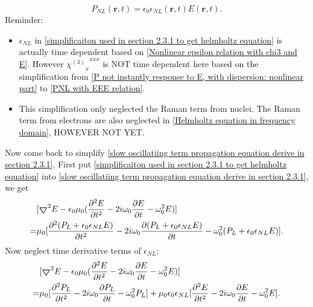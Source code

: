 \documentclass[12pt]{extarticle}
\numberwithin{equation}{section}
\numberwithin{figure}{section}
\numberwithin{table}{section}
\newcommand{\<}{\langle}
\renewcommand{\>}{\rangle}
\theoremstyle{definition}
\newcommand{\Lap}{\boldsymbol{\bigtriangledown}}
\begin{document}
\begin{itemize}
{                    \begin{equation}
                        P_{NL}(\boldsymbol{r},t)= \epsilon_0 \epsilon_{NL}(\boldsymbol{r},t) E(\boldsymbol{r},t).
                    \label{simplificaiton used in section 2.3.1 to get helmholtz equation}
                    \end{equation}
                    Reminder: 
                    \begin{itemize}
                        \item $\epsilon_{NL}$ in \autoref{simplificaiton used in section 2.3.1 to get helmholtz equation} is actually time dependent based on \autoref{Nonlinear epsilon relation with chi3 and E}. However ${{\chi^{(3)}}_x}^{xxx}$ is NOT time dependent here based on the simplification from \autoref{P not instantly response to E, with dispersion: nonlinear part} to \autoref{PNL with EEE relation}.
                        \item This simplification only neglected the Raman term from nuclei. The Raman term from electrons are also neglected in \autoref{Helmholtz equation in frequency domain}, HOWEVER NOT YET. 
                    \end{itemize}
                    }
                    
                    
                Now come back to simplify \autoref{slow oscillatiing term propagation equation derive in section 2.3.1}. First put \autoref{simplificaiton used in section 2.3.1 to get helmholtz equation} into \autoref{slow oscillatiing term propagation equation derive in section 2.3.1}, we get
                \begin{equation}
                \begin{split}
                    &[\Lap^2 E-\epsilon_0 \mu_0(\pdv[2]{E}{t}-2i\omega_0\pdv{E}{t}-\omega_0^2 E)]\\
                    =&\mu_0[\pdv[2]{(P_L+\epsilon_0 \epsilon_{NL} E)}{t}-2i\omega_0\pdv{(P_L+\epsilon_0 \epsilon_{NL} E)}{t}-\omega_0^2(P_L+\epsilon_0 \epsilon_{NL} E)].
                \end{split}
                \label{slow oscillatiing term propagation equation derive in section 2.3.1-part 2}
                \end{equation}
                Now neglect time derivative terms of $\epsilon_{NL}$:
                \begin{equation}
                \begin{split}
                    &[\Lap^2 E-\epsilon_0 \mu_0(\pdv[2]{E}{t}-2i\omega_0\pdv{E}{t}-\omega_0^2 E)]\\
                    =&\mu_0[\pdv[2]{P_L}{t}-2i\omega_0\pdv{P_L}{t}-\omega_0^2P_L]+\mu_0\epsilon_0\epsilon_{NL}[\pdv[2]{E}{t}-2i\omega_0\pdv{E}{t}-\omega_0^2 E].
                \end{split}
                \label{slow oscillatiing term propagation equation derive in section 2.3.1-part 3}
                \end{equation}
                

\end{itemize}
\end{document}
